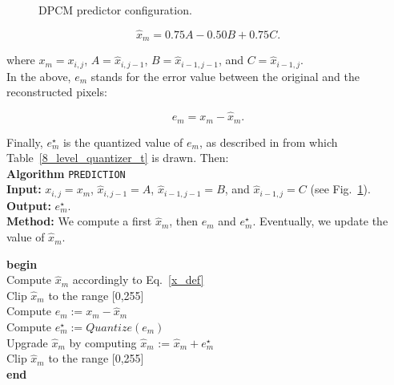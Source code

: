 \documentclass[11pt,a4paper]{article}
\newcommand{\xh}{\hat{x}}
\newcommand{\xm}{x_m}
\newcommand{\xmh}{\hat{x}_m}
\newcommand{\ems}{e^{\star}_m}
\begin{document}
\begin{figure}[htbp]
  \centerline{
    }
  \caption{DPCM predictor configuration.}
  \label{pred_cfg}
\end{figure}

\begin{equation}
  \xmh = 0.75A - 0.50B + 0.75C.
  \label{x_def}
\end{equation}

where $\xm = x_{i,j}$, $A = \xh_{i,j-1}$, $B = \xh_{i-1,j-1}$, and
$C = \xh_{i-1,j}$.\\

In the above, $e_m$ stands for the error value between the original and the
reconstructed pixels:

\begin{equation}
e_m = \xm - \xmh.
\end{equation}

Finally, $\ems$ is the quantized value of $e_m$, as described in
\cite{rj} from which Table~\ref{8_level_quantizer_t} is drawn.
Then:\\

{\bf Algorithm} {\tt PREDICTION}\\
{\bf Input:} $x_{i,j} = \xm$, $\xh_{i,j-1} = A$, $\xh_{i-1,j-1} = B$, and
$\xh_{i-1,j} = C$ (see Fig.~\ref{pred_cfg}).\\
{\bf Output:} $\ems$.\\
{\bf Method:} We compute a first $\xmh$, then $e_m$ and
$\ems$. Eventually, we update the value of $\xmh$.\\

\begin{tabbing}
{\bf begin}\=  \\
        \> Compute $\xmh$ accordingly to Eq.~\ref{x_def} \\
        \> Clip $\xmh$ to the range [0,255] \\
        \> Compute $e_m := x_m - \xmh$ \\
        \> Compute $\ems := Quantize (e_m)$ \\
        \> Upgrade $\xmh$ by computing $\xmh$ := $\xmh + \ems$ \\
        \> Clip $\xmh$ to the range [0,255] \\
{\bf end}
\end{tabbing}
\noindent
\end{document}
